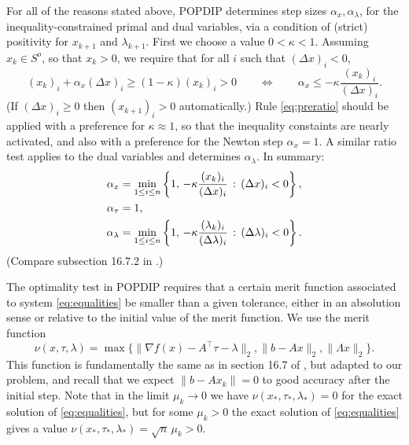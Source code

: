 \documentclass[11pt]{article}
\newcommand{\grad}{\nabla}
\begin{document}
For all of the reasons stated above, POPDIP determines step sizes $\alpha_x,\alpha_\lambda$, for the inequality-constrained primal and dual variables, via a condition of (strict) positivity for $x_{k+1}$ and $\lambda_{k+1}$.  First we choose a value $0<\kappa<1$.  Assuming $x_k\in S^o$, so that $x_k>0$, we require that for all $i$ such that $(\Delta x)_i < 0$,
\begin{equation}
(x_k)_i + \alpha_x (\Delta x)_i \ge (1-\kappa) (x_k)_i > 0 \qquad \iff \qquad \alpha_x \le - \kappa \frac{(x_k)_i}{(\Delta x)_i}. \label{eq:preratio}
\end{equation}
(If $(\Delta x)_i \ge 0$ then $(x_{k+1})_i>0$ automatically.)  Rule \eqref{eq:preratio} should be applied with a preference for $\kappa \approx 1$, so that the inequality constaints are nearly activated, and also with a preference for the Newton step $\alpha_x=1$.  A similar ratio test applies to the dual variables and determines $\alpha_\lambda$.  In summary:
\begin{align}
\alpha_x &= \min_{1\le i\le n} \left\{1, \,-\kappa \frac{(x_k)_i}{(\Delta x)_i} \,:\, (\Delta x)_i < 0\right\}, \label{eq:ratiotests} \\
\alpha_\tau &= 1, \notag \\
\alpha_\lambda &= \min_{1\le i\le n} \left\{1, \,-\kappa \frac{(\lambda_k)_i}{(\Delta \lambda)_i} \,:\, (\Delta \lambda)_i < 0\right\}. \notag
\end{align}
(Compare subsection 16.7.2 in \cite{GrivaNashSofer2009}.)

The optimality test in POPDIP requires that a certain merit function associated to system \eqref{eq:equalities} be smaller than a given tolerance, either in an absolution sense or relative to the initial value of the merit function.  We use the merit function
\begin{equation}
    \nu(x,\tau,\lambda) = \max\{\|\grad f(x)-A^\top \tau - \lambda\|_2,\|b-Ax\|_2,\|\Lambda x\|_2\}.  \label{eq:meritfunction}
\end{equation}
This function is fundamentally the same as in section 16.7 of \cite{GrivaNashSofer2009}, but adapted to our problem, and recall that we expect $\|b-Ax_k\|=0$ to good accuracy after the initial step.  Note that in the limit $\mu_k\to 0$ we have $\nu(x_*,\tau_*,\lambda_*) = 0$ for the exact solution of \eqref{eq:equalities}, but for some $\mu_k > 0$ the exact solution of \eqref{eq:equalities} gives a value $\nu(x_*,\tau_*,\lambda_*)=\sqrt{n}\, \mu_k>0$.
\end{document}
